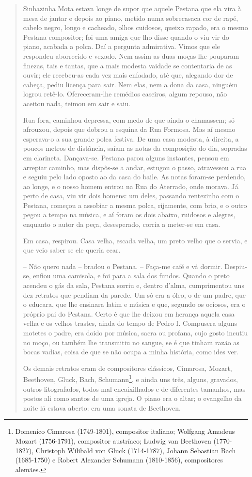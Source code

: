 \begin{quote}
Sinhazinha Mota estava longe de supor que aquele Pestana que ela vira à
mesa de jantar e depois ao piano, metido numa sobrecasaca cor de rapé,
cabelo negro, longo e cacheado, olhos cuidosos, queixo rapado, era o
mesmo Pestana compositor; foi uma amiga que lho disse quando o viu vir
do piano, acabada a polca. Daí a pergunta admirativa. Vimos que ele
respondeu aborrecido e vexado. Nem assim as duas moças lhe pouparam
finezas, tais e tantas, que a mais modesta vaidade se contentaria de as
ouvir; ele recebeu-as cada vez mais enfadado, até que, alegando dor de
cabeça, pediu licença para sair. Nem elas, nem a dona da casa, ninguém
logrou retê-lo. Ofereceram-lhe remédios caseiros, algum repouso, não
aceitou nada, teimou em sair e saiu.

Rua fora, caminhou depressa, com medo de que ainda o chamassem; só
afrouxou, depois que dobrou a esquina da Rua Formosa. Mas aí mesmo
esperava-o a sua grande polca festiva. De uma casa modesta, à direita, a
poucos metros de distância, saíam as notas da composição do dia,
sopradas em clarineta. Dançava-se. Pestana parou alguns instantes,
pensou em arrepiar caminho, mas dispôs-se a andar, estugou o passo,
atravessou a rua e seguiu pelo lado oposto ao da casa do baile. As notas
foram-se perdendo, ao longe, e o nosso homem entrou na Rua do Aterrado,
onde morava. Já perto de casa, viu vir dois homens: um deles, passando
rentezinho com o Pestana, começou a assobiar a mesma polca, rijamente,
com brio, e o outro pegou a tempo na música, e aí foram os dois abaixo,
ruidosos e alegres, enquanto o autor da peça, desesperado, corria a
meter-se em casa.

Em casa, respirou. Casa velha, escada velha, um preto velho que o
servia, e que veio saber se ele queria cear.

-- Não quero nada -- bradou o Pestana. -- Faça-me café e vá dormir.
Despiu-se, enfiou uma camisola, e foi para a sala dos fundos. Quando o
preto acendeu o gás da sala, Pestana sorriu e, dentro d'alma,
cumprimentou uns dez retratos que pendiam da parede. Um só era a óleo, o
de um padre, que o educara, que lhe ensinara latim e música e que,
segundo os ociosos, era o próprio pai do Pestana. Certo é que lhe deixou
em herança aquela casa velha e os velhos trastes, ainda do tempo de
Pedro I. Compusera alguns motetes o padre, era doido por música, sacra
ou profana, cujo gosto incutiu no moço, ou também lhe transmitiu no
sangue, se é que tinham razão as bocas vadias, coisa de que se não ocupa
a minha história, como ides ver.

Os demais retratos eram de compositores clássicos, Cimarosa, Mozart,
Beethoven, Gluck, Bach, Schumann\footnote{Domenico Cimarosa (1749-1801),
  compositor italiano; Wolfgang Amadeus Mozart (1756-1791), compositor
  austríaco; Ludwig van Beethoven (1770-1827), Christoph Wilibald von
  Gluck (1714-1787), Johann Sebastian Bach (1685-1750) e Robert
  Alexander Schumann (1810-1856), compositores alemães.}, e ainda uns
três, alguns, gravados, outros litografados, todos mal encaixilhados e
de diferentes tamanhos, mas postos ali como santos de uma igreja. O
piano era o altar; o evangelho da noite lá estava aberto: era uma sonata
de Beethoven.


\end{quote}
